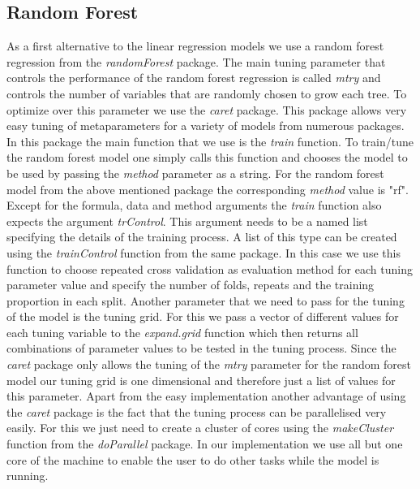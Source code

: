 \subsection{Random Forest}
As a first alternative to the linear regression models we use a random forest regression from the \textit{randomForest} package. The main tuning parameter that controls the performance of the random forest regression is called \textit{mtry} and controls the number of variables that are randomly chosen to grow each tree. To optimize over this parameter we use the \textit{caret} package. This package allows very easy tuning of metaparameters for a variety of models from numerous packages. In this package the main function that we use is the \textit{train} function. To train/tune the random forest model one simply calls this function and chooses the model to be used by passing the \textit{method} parameter as a string. For the random forest model from the above mentioned package the corresponding \textit{method} value is "rf". Except for the formula, data and method arguments the \textit{train} function also expects the argument \textit{trControl}. This argument needs to be a named list specifying the details of the training process. A list of this type can be created using the \textit{trainControl} function from the same package. In this case we use this function to choose repeated cross validation as evaluation method for each tuning parameter value and specify the number of folds, repeats and the training proportion in each split.  Another parameter that we need to pass for the tuning of the model is the tuning grid. For this we pass a vector of different values for each tuning variable to the \textit{expand.grid} function which then returns all combinations of parameter values to be tested in the tuning process. Since the \textit{caret} package only allows the tuning of the \textit{mtry} parameter for the random forest model our tuning grid is one dimensional and therefore just a list of values for this parameter. Apart from the easy implementation another advantage of using the \textit{caret} package is the fact that the tuning process can be parallelised very easily. For this we just need to create a cluster of cores using the \textit{makeCluster} function from the \textit{doParallel} package. In our implementation we use all but one core of the machine to enable the user to do other tasks while the model is running.

